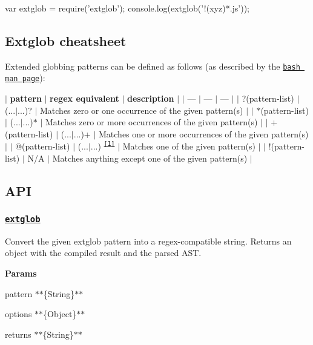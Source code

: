 \begin{DoxyCode}
var extglob = require('extglob');
console.log(extglob('!(xyz)*.js'));
\end{DoxyCode}


\subsection*{Extglob cheatsheet}

Extended globbing patterns can be defined as follows (as described by the \href{https://www.gnu.org/software/bash/manual/html_node/Pattern-Matching.html}{\tt bash man page})\+:

$\vert$ {\bfseries pattern} $\vert$ {\bfseries regex equivalent} $\vert$ {\bfseries description} $\vert$ $\vert$ --- $\vert$ --- $\vert$ --- $\vert$ $\vert$ {\ttfamily ?(pattern-\/list)} $\vert$ {\ttfamily (...$\vert$...)?} $\vert$ Matches zero or one occurrence of the given pattern(s) $\vert$ $\vert$ {\ttfamily $\ast$(pattern-\/list)} $\vert$ {\ttfamily (...$\vert$...)$\ast$} $\vert$ Matches zero or more occurrences of the given pattern(s) $\vert$ $\vert$ {\ttfamily +(pattern-\/list)} $\vert$ {\ttfamily (...$\vert$...)+} $\vert$ Matches one or more occurrences of the given pattern(s) $\vert$ $\vert$ {\ttfamily @(pattern-\/list)} $\vert$ {\ttfamily (...$\vert$...)} \textsuperscript{\href{#fn1}{\tt \mbox{[}1\mbox{]}}} $\vert$ Matches one of the given pattern(s) $\vert$ $\vert$ {\ttfamily !(pattern-\/list)} $\vert$ N/A $\vert$ Matches anything except one of the given pattern(s) $\vert$

\subsection*{A\+PI}

\subsubsection*{\href{index.js#L36}{\tt extglob}}

Convert the given {\ttfamily extglob} pattern into a regex-\/compatible string. Returns an object with the compiled result and the parsed A\+ST.

{\bfseries Params}


\begin{DoxyItemize}
\item {\ttfamily pattern} $\ast$$\ast$\{String\}$\ast$$\ast$
\item {\ttfamily options} $\ast$$\ast$\{Object\}$\ast$$\ast$
\item {\ttfamily returns} $\ast$$\ast$\{String\}$\ast$$\ast$
\end{DoxyItemize}

